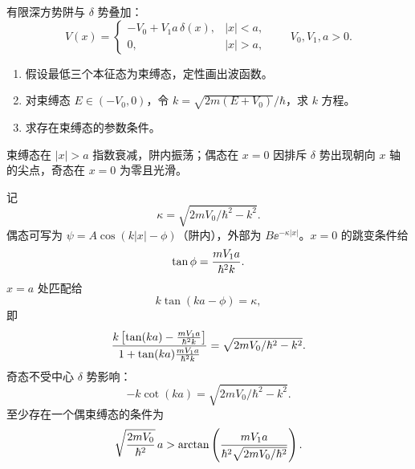 \begin{question}
有限深方势阱与 $\delta$ 势叠加：
\[
V(x)=\begin{cases}
-V_0+V_1a\,\delta(x),& |x|<a,\\
0,& |x|>a,
\end{cases}
\qquad V_0,V_1,a>0.
\]
\begin{enumerate}
  \item 假设最低三个本征态为束缚态，定性画出波函数。
  \item 对束缚态 $E\in(-V_0,0)$，令 $k=\sqrt{2m(E+V_0)}/\hbar$，求 $k$ 方程。
  \item 求存在束缚态的参数条件。
\end{enumerate}
\begin{solution}
束缚态在 $|x|>a$ 指数衰减，阱内振荡；偶态在 $x=0$ 因排斥 $\delta$ 势出现朝向 $x$ 轴的尖点，奇态在 $x=0$ 为零且光滑。

记
\[
  \kappa=\sqrt{2mV_0/\hbar^2-k^2}.
\]
偶态可写为 $\psi=A\cos(k|x|-\phi)$（阱内），外部为 $B\ee^{-\kappa|x|}$。$x=0$ 的跳变条件给
\[
  \tan\phi={mV_1a\over\hbar^2k}.
\]
$x=a$ 处匹配给
\[
  k\tan(ka-\phi)=\kappa,
\]
即
\[
  {k\left[\tan(ka)-{mV_1a\over\hbar^2k}\right]
  \over1+\tan(ka){mV_1a\over\hbar^2k}}
  =\sqrt{2mV_0/\hbar^2-k^2}.
\]
奇态不受中心 $\delta$ 势影响：
\[
  -k\cot(ka)=\sqrt{2mV_0/\hbar^2-k^2}.
\]
至少存在一个偶束缚态的条件为
\[
  \sqrt{2mV_0\over\hbar^2}\,a>
  \arctan\left({mV_1a\over\hbar^2\sqrt{2mV_0/\hbar^2}}\right).
\]
\end{solution}
\end{question}

